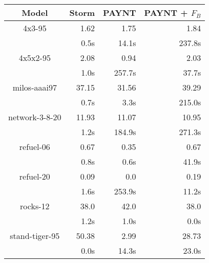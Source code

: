 \documentclass{article}
\begin{document}
\begin{table}
\begin{tabular}{|c|r|r|r|}
\hline

Model & Storm & PAYNT & PAYNT + $F_{B}$ \\ \hline 

4x3-95 & 1.62 & 1.75 & 1.84 \\
 & 0.5s & 14.1s & 237.8s \\
\hline
4x5x2-95 & 2.08 & 0.94 & 2.03 \\
 & 1.0s & 257.7s & 37.7s \\
\hline
milos-aaai97 & 37.15 & 31.56 & 39.29 \\
 & 0.7s & 3.3s & 215.0s \\
\hline
network-3-8-20 & 11.93 & 11.07 & 10.95 \\
 & 1.2s & 184.9s & 271.3s \\
\hline
refuel-06 & 0.67 & 0.35 & 0.67 \\
 & 0.8s & 0.6s & 41.9s \\
\hline
refuel-20 & 0.09 & 0.0 & 0.19 \\
 & 1.6s & 253.9s & 11.2s \\
\hline
rocks-12 & 38.0 & 42.0 & 38.0 \\
 & 1.2s & 1.0s & 0.0s \\
\hline
stand-tiger-95 & 50.38 & 2.99 & 28.73 \\
 & 0.0s & 14.3s & 23.0s \\
\hline
\end{tabular}
\end{table}
\end{document}
